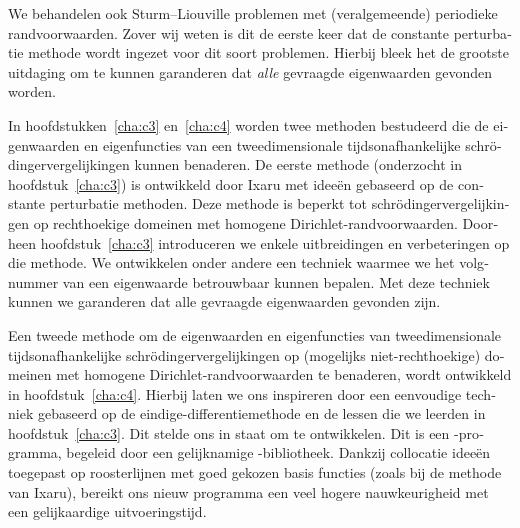 \begin{otherlanguage}{dutch}
We behandelen ook Sturm--Liouville problemen met (veralgemeende) periodieke randvoorwaarden. Zover wij weten is dit de eerste keer dat de constante perturbatie methode wordt ingezet voor dit soort problemen. Hierbij bleek het de grootste uitdaging om te kunnen garanderen dat \emph{alle} gevraagde eigenwaarden gevonden worden.

In hoofdstukken~\ref{cha:c3} en~\ref{cha:c4} worden twee methoden bestudeerd die de eigenwaarden en eigenfuncties van een tweedimensionale tijdsonafhankelijke schrödinger\-vergelijkingen kunnen benaderen. De eerste methode (onderzocht in hoofdstuk~\ref{cha:c3}) is ontwikkeld door Ixaru met ideeën gebaseerd op de constante perturbatie methoden. Deze methode is beperkt tot schrödingervergelijkingen op rechthoekige domeinen met homogene Dirichlet-randvoorwaarden. Doorheen hoofdstuk~\ref{cha:c3} introduceren we enkele uitbreidingen en verbeteringen op die methode. We ontwikkelen onder andere een techniek waarmee we het volgnummer van een eigenwaarde betrouwbaar kunnen bepalen. Met deze techniek kunnen we garanderen dat alle gevraagde eigenwaarden gevonden zijn.

Een tweede methode om de eigenwaarden en eigenfuncties van tweedimensionale tijdsonafhankelijke schrödingervergelijkingen op (mogelijks niet-rechthoekige) domeinen met homogene Dirichlet-randvoorwaarden te benaderen, wordt ontwikkeld in hoofdstuk~\ref{cha:c4}. Hierbij laten we ons inspireren door een eenvoudige techniek gebaseerd op de eindige-differentiemethode en de lessen die we leerden in hoofdstuk~\ref{cha:c3}. Dit stelde ons in staat om \strands{} te ontwikkelen. Dit is een \cpp{}-programma, begeleid door een gelijknamige \lpython{}-bibliotheek. Dankzij collocatie ideeën toegepast op roosterlijnen met goed gekozen basis functies (zoals bij de methode van Ixaru), bereikt ons nieuw programma een veel hogere nauwkeurigheid met een gelijkaardige uitvoeringstijd. 

\end{otherlanguage}

\stopchapter
